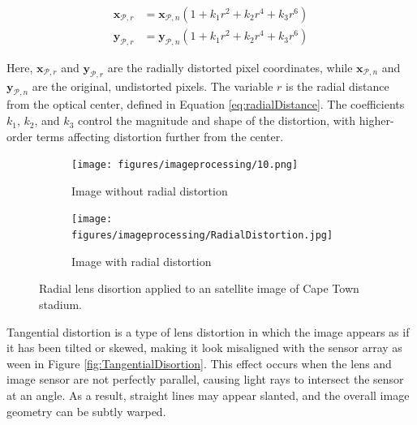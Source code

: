 \begin{equation}
    \begin{split}
    \mathbf{x}_{\mathcal{P},r}  &= \mathbf{x}_{\mathcal{P},n}(1 + k_1r^2 + k_2r^4 + k_3r^6) \\
    \mathbf{y}_{\mathcal{P},r}  &= \mathbf{y}_{\mathcal{P},n}(1+ k_1r^2 + k_2r^4 + k_3r^6)
    \end{split}
\end{equation}

\noindent
Here, $\mathbf{x}_{\mathcal{P},r}$ and $\mathbf{y}_{\mathcal{P},r}$ are the radially distorted pixel coordinates, while $\mathbf{x}_{\mathcal{P},n}$ and $\mathbf{y}_{\mathcal{P},n}$ are the original, undistorted pixels. 
The variable $r$ is the radial distance from the optical center, defined in Equation \ref{eq:radialDistance}. 
The coefficients $k_1$, $k_2$, and $k_3$ control the magnitude and shape of the distortion, with higher-order terms affecting distortion further from the center.

\begin{figure}[H]
    \centering
    \begin{subfigure}[b]{0.48\linewidth}
        \centering
        \texttt{[image: figures/imageprocessing/10.png]}
        \caption{Image without radial distortion}
        \label{fig:RD1}
    \end{subfigure}
    \hfill
    \begin{subfigure}[b]{0.48\linewidth}
        \centering
        \texttt{[image: figures/imageprocessing/RadialDistortion.jpg]}
        \caption{Image with radial distortion}
        \label{fig:Radial2}
    \end{subfigure}
    \caption{Radial lens disortion applied to an satellite image of Cape Town stadium.}
    \label{fig:RadialDisortion}
\end{figure}


Tangential distortion is a type of lens distortion in which the image appears as if it has been tilted or skewed, making it look misaligned with the 
sensor array as ween in Figure \ref{fig:TangentialDisortion}. This effect occurs when the lens and image sensor are not perfectly parallel, causing light rays to intersect the sensor at an angle. As a 
result, straight lines may appear slanted, and the overall image geometry can be subtly warped.

